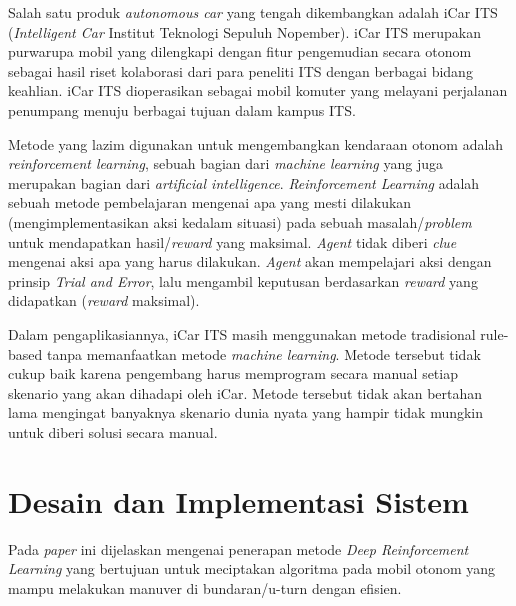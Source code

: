 \documentclass[conference]{IEEEtran}
\begin{document}
	Salah satu produk \textit{autonomous car }yang tengah dikembangkan adalah iCar ITS (\textit{Intelligent Car }Institut Teknologi Sepuluh Nopember). iCar ITS merupakan purwarupa mobil yang dilengkapi dengan fitur pengemudian secara otonom sebagai hasil riset kolaborasi dari para peneliti ITS dengan berbagai bidang keahlian.\cite{cit:icar_menristekbrin} iCar ITS dioperasikan sebagai mobil komuter yang melayani perjalanan penumpang menuju berbagai tujuan dalam kampus ITS.\cite{cit:icar_its_news}
	

	
	Metode yang lazim digunakan untuk mengembangkan kendaraan otonom adalah \textit{reinforcement learning}, sebuah bagian dari \textit{machine learning }yang juga merupakan bagian dari \textit{artificial intelligence}. \textit{Reinforcement Learning }adalah sebuah metode pembelajaran mengenai apa yang mesti dilakukan (mengimplementasikan aksi kedalam situasi) pada sebuah masalah/\textit{problem }untuk mendapatkan hasil/\textit{reward }yang maksimal. \textit{Agent }tidak diberi \textit{clue }mengenai aksi apa yang harus dilakukan. \textit{Agent }akan mempelajari aksi dengan prinsip \textit{Trial and Error}, lalu mengambil keputusan berdasarkan \textit{reward }yang didapatkan (\textit{reward }maksimal).
	
	Dalam pengaplikasiannya, iCar ITS masih menggunakan metode tradisional rule-based tanpa memanfaatkan metode \textit{machine learning}. Metode tersebut tidak cukup baik karena pengembang harus memprogram secara manual setiap skenario yang akan dihadapi oleh iCar. Metode tersebut tidak akan bertahan lama mengingat banyaknya skenario dunia nyata yang hampir tidak mungkin untuk diberi solusi secara manual.
	
	\section{Desain dan Implementasi Sistem}
	\vspace{1ex}
	Pada \textit{paper} ini dijelaskan mengenai penerapan metode \textit{Deep Reinforcement Learning} yang bertujuan untuk meciptakan algoritma pada mobil otonom yang mampu melakukan manuver di bundaran/u-turn dengan efisien.
	
\end{document}
